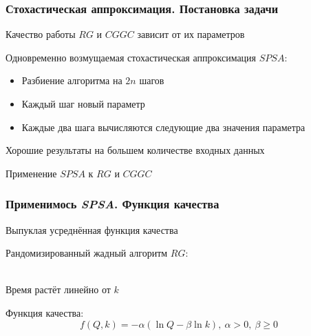 \begin{frame}
	\frametitle{Стохастическая аппроксимация. Постановка задачи}
	Качество работы $RG$ и $CGGC$ зависит от их параметров \vspace{.5em}

	Одновременно возмущаемая стохастическая аппроксимация $SPSA$:
	\begin{itemize}
		\item Разбиение алгоритма на $2n$ шагов
		\item Каждый шаг новый параметр
		\item Каждые два шага вычисляются следующие два значения параметра
	\end{itemize} \vspace{.5em}

	Хорошие результаты на большем количестве входных данных \vspace{.5em}

	Применение $SPSA$ к $RG$ и $CGGC$
\end{frame}


\begin{frame}
	\frametitle{Применимось \emph{SPSA}. Функция качества}
	Выпуклая усреднённая функция качества\vspace{.5em}
	
	Рандомизированный жадный алгоритм $RG$:\vspace{-1em}
	\begin{figure}[H]
		\columnwidth
	\end{figure}~\vspace{-2.5em}\\

	Время растёт линейно от $k$\vspace{.5em}

	Функция качества:\vspace{-.5em} $$f(Q, k) = -\alpha (\ln Q - \beta \ln k),\ \alpha > 0,\ \beta \ge 0$$
\end{frame}


